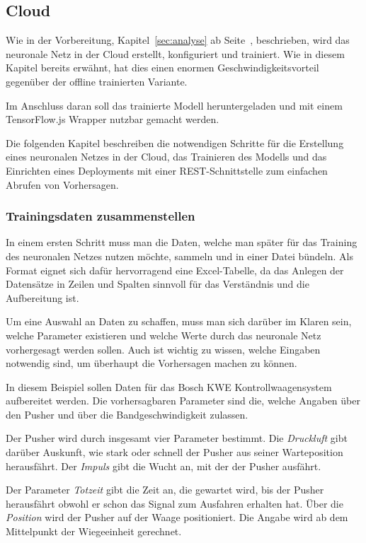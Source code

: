 \subsection{Cloud}
Wie in der Vorbereitung, Kapitel~\ref{sec:analyse} ab Seite~\pageref{sec:analyse}, beschrieben, wird das neuronale Netz
in der Cloud erstellt, konfiguriert und trainiert. Wie in diesem Kapitel bereits erwähnt, hat dies einen enormen
Geschwindigkeitsvorteil gegenüber der offline trainierten Variante.

Im Anschluss daran soll das trainierte Modell heruntergeladen und mit einem TensorFlow.js Wrapper nutzbar gemacht
werden.

Die folgenden Kapitel beschreiben die notwendigen Schritte für die Erstellung eines neuronalen Netzes in der Cloud, das
Trainieren des Modells und das Einrichten eines Deployments mit einer REST-Schnittstelle zum einfachen Abrufen von
Vorhersagen.

\subsubsection{Trainingsdaten zusammenstellen}
In einem ersten Schritt muss man die Daten, welche man später für das Training des neuronalen Netzes nutzen möchte,
sammeln und in einer Datei bündeln. Als Format eignet sich dafür hervorragend eine Excel-Tabelle, da das Anlegen der
Datensätze in Zeilen und Spalten sinnvoll für das Verständnis und die Aufbereitung ist.

Um eine Auswahl an Daten zu schaffen, muss man sich darüber im Klaren sein, welche Parameter existieren und welche Werte
durch das neuronale Netz vorhergesagt werden sollen. Auch ist wichtig zu wissen, welche Eingaben notwendig sind, um
überhaupt die Vorhersagen machen zu können.

In diesem Beispiel sollen Daten für das Bosch KWE Kontrollwaagensystem aufbereitet werden. Die vorhersagbaren Parameter
sind die, welche Angaben über den Pusher und über die Bandgeschwindigkeit zulassen.

Der Pusher wird durch insgesamt vier Parameter bestimmt. Die \textit{Druckluft} gibt darüber Auskunft, wie stark oder
schnell der Pusher aus seiner Warteposition herausfährt. Der \textit{Impuls} gibt die Wucht an, mit der der Pusher
ausfährt.

Der Parameter \textit{Totzeit} gibt die Zeit an, die gewartet wird, bis der Pusher herausfährt obwohl er schon das
Signal zum Ausfahren erhalten hat. Über die \textit{Position} wird der Pusher auf der Waage positioniert. Die Angabe
wird ab dem Mittelpunkt der Wiegeeinheit gerechnet.

